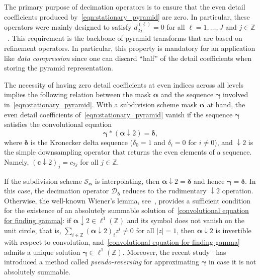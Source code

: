 \documentclass[11pt,a4paper]{article}
\theoremstyle{definition}
\begin{document}
The primary purpose of decimation operators is to ensure that the even detail coefficients produced by~\eqref{eqn:stationary_pyramid} are zero. In particular, these operators were mainly designed to satisfy $d^{(\ell)}_{2j}=0$ for all $\ell=1,\dots,J$ and $j\in\mathbb{Z}$~\cite{dyn2021linear}. This requirement is the backbone of pyramid transforms that are based on refinement operators. In particular, this property is mandatory for an application like \emph{data compression} since one can discard ``half'' of the detail coefficients when storing the pyramid representation.

The necessity of having zero detail coefficients at even indices across all levels implies the following relation between the mask $\boldsymbol{\alpha}$ and the sequence $\boldsymbol{\gamma}$ involved in~\eqref{eqn:stationary_pyramid}. With a subdivision scheme mask $\boldsymbol{\alpha}$ at hand, the even detail coefficients of~\eqref{eqn:stationary_pyramid} vanish if the sequence $\boldsymbol{\gamma}$ satisfies the convolutional equation
\begin{equation} \label{convolutional equation for finding gamma}
    \boldsymbol{\gamma}*(\boldsymbol{\alpha}\downarrow2)=\boldsymbol{\delta},
\end{equation}
where $\boldsymbol{\delta}$ is the Kronecker delta sequence ($\delta_0=1$ and $\delta_i=0$ for $i \neq 0$), and $\downarrow 2$ is the simple downsampling operator that returns the even elements of a sequence. Namely, $(\boldsymbol{c}\downarrow2)_{j}=c_{2j}$ for all $j\in\mathbb{Z}$.

If the subdivision scheme $\mathcal{S}_{\boldsymbol{\alpha}}$ is interpolating, then $\boldsymbol{\alpha}\downarrow2=\boldsymbol{\delta}$ and hence $\boldsymbol{\gamma}=\boldsymbol{\delta}$. In this case, the decimation operator $\mathcal{D}_{\boldsymbol{\delta}}$ reduces to the rudimentary $\downarrow2$ operation. Otherwise, the well-known Wiener's lemma, see~\cite[Chapter 5]{forster2010four}, provides a sufficient condition for the existence of an absolutely summable solution of~\eqref{convolutional equation for finding gamma}: if $\boldsymbol{\alpha}\downarrow2\in\ell^1(\mathbb{Z})$ and its symbol does not vanish on the unit circle, that is, $\sum_{i\in\mathbb{Z}}(\boldsymbol{\alpha}\downarrow2)_i z^i\neq0$ for all $|z|=1$, then $\boldsymbol{\alpha}\downarrow2$ is invertible with respect to convolution, and~\eqref{convolutional equation for finding gamma} admits a unique solution $\boldsymbol{\gamma}\in\ell^1(\mathbb{Z})$. Moreover, the recent study~\cite{mattar2023pseudo} has introduced a method called \emph{pseudo-reversing} for approximating $\boldsymbol{\gamma}$ in case it is not absolutely summable.
\end{document}
